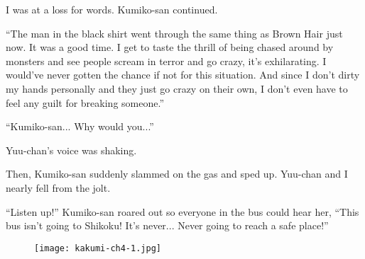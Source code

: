 I was at a loss for words. Kumiko-san continued.

``The man in the black shirt went through the same thing as Brown Hair just now. It was a good time. I get to taste the thrill of being chased around by monsters and see people scream in terror and go crazy, it's exhilarating. I would've never gotten the chance if not for this situation. And since I don't dirty my hands personally and they just go crazy on their own, I don't even have to feel any guilt for breaking someone.''

``Kumiko-san... Why would you...''

Yuu-chan's voice was shaking.

Then, Kumiko-san suddenly slammed on the gas and sped up. Yuu-chan and I nearly fell from the jolt.

``Listen up!'' Kumiko-san roared out so everyone in the bus could hear her, ``This bus isn't going to Shikoku! It's never... Never going to reach a safe place!''

\begin{figure}[p]
\texttt{[image: kakumi-ch4-1.jpg]}
\end{figure}
